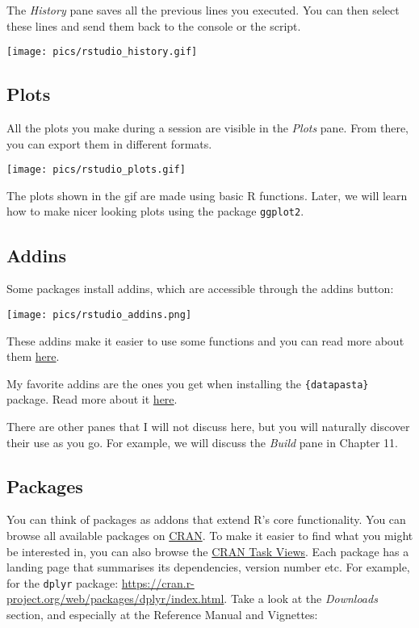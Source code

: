 \documentclass[
]{article}
\begin{document}
The \emph{History} pane saves all the previous lines you executed. You can then select these lines and
send them back to the console or the script.

\texttt{[image: pics/rstudio\_history.gif]}

\hypertarget{plots}{%
\subsection{Plots}\label{plots}}

All the plots you make during a session are visible in the \emph{Plots} pane. From there, you can
export them in different formats.

\texttt{[image: pics/rstudio\_plots.gif]}

The plots shown in the gif are made using basic R functions. Later, we will learn how to make nicer
looking plots using the package \texttt{ggplot2}.

\hypertarget{addins}{%
\subsection{Addins}\label{addins}}

Some packages install addins, which are accessible through the addins button:

\texttt{[image: pics/rstudio\_addins.png]}

These addins make it easier to use some functions and you can read more about them \href{https://rstudio.github.io/rstudioaddins/\#overview}{here}.

My favorite addins are the ones you get when installing the \texttt{\{datapasta\}} package. Read more about
it \href{https://github.com/MilesMcBain/datapasta}{here}.

There are other panes that I will not discuss here, but you will naturally discover their use as you
go. For example, we will discuss the \emph{Build} pane in Chapter 11.

\hypertarget{packages}{%
\subsection{Packages}\label{packages}}

You can think of packages as addons that extend R's core functionality. You can browse all available
packages on \href{https://cloud.r-project.org/}{CRAN}. To make it easier to find what you might be
interested in, you can also browse the \href{https://cloud.r-project.org/web/views/}{CRAN Task Views}.
Each package has a landing page that summarises its dependencies, version number etc. For example,
for the \texttt{dplyr} package: \url{https://cran.r-project.org/web/packages/dplyr/index.html}.
Take a look at the \emph{Downloads} section, and especially at the Reference Manual and Vignettes:
\end{document}
